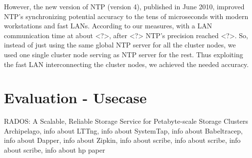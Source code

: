 \documentclass[a4paper,10pt,twocolumn]{article}
\begin{document}
However, the new version of NTP (version 4), published in June 2010, improved
NTP's synchronizing potential accuracy to the tens of microseconds with modern
workstations and fast LANs. According to our measures, with a LAN communication
time at about <?>, after <?> NTP's precision reached <?>.  So, instead of just
using the same global NTP server for all the cluster nodes, we used one single
cluster node serving as NTP server for the rest. Thus exploiting the fast LAN
interconnecting the cluster nodes, we achieved the needed accuracy.
 
\section{Evaluation - Usecase}

\begin{thebibliography}{9}
    RADOS: A Scalable, Reliable Storage Service for Petabyte-scale
    Storage Clusters
    Archipelago,
    info about
    LTTng,
    info about
    SystemTap,
    info about
    Babeltracep,
    info about
    Dapper,
    info about
    Zipkin,
   info about
    scribe,
   info about
    scribe,
   info about
    scribe,
   info about
    hp paper
\end{thebibliography}
\end{document}
